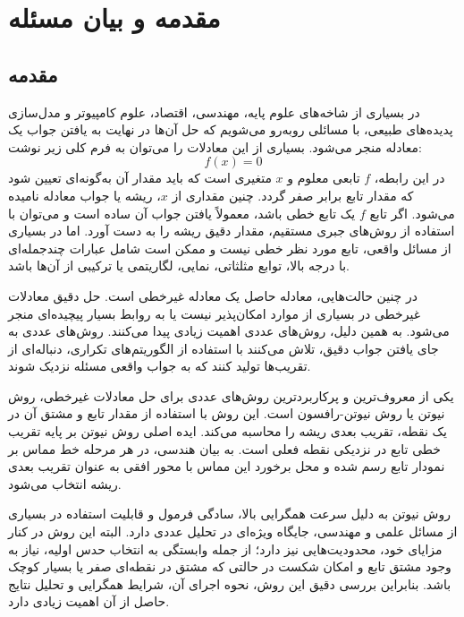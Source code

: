 \chapter{مقدمه و بیان مسئله}
\label{ch:intro}

\section{مقدمه}

در بسیاری از شاخه‌های علوم پایه، مهندسی، اقتصاد، علوم کامپیوتر و مدل‌سازی پدیده‌های طبیعی، با مسائلی روبه‌رو می‌شویم که حل آن‌ها در نهایت به یافتن جواب یک معادله منجر می‌شود. بسیاری از این معادلات را می‌توان به فرم کلی زیر نوشت:
\begin{equation}
f(x)=0
\label{eq:fzero}
\end{equation}
در این رابطه، $f$ تابعی معلوم و $x$ متغیری است که باید مقدار آن به‌گونه‌ای تعیین شود که مقدار تابع برابر صفر گردد. چنین مقداری از $x$، ریشه یا جواب معادله نامیده می‌شود. اگر تابع $f$ یک تابع خطی باشد، معمولاً یافتن جواب آن ساده است و می‌توان با استفاده از روش‌های جبری مستقیم، مقدار دقیق ریشه را به دست آورد. اما در بسیاری از مسائل واقعی، تابع مورد نظر خطی نیست و ممکن است شامل عبارات چندجمله‌ای با درجه بالا، توابع مثلثاتی، نمایی، لگاریتمی یا ترکیبی از آن‌ها باشد.

در چنین حالت‌هایی، معادله حاصل یک معادله غیرخطی است. حل دقیق معادلات غیرخطی در بسیاری از موارد امکان‌پذیر نیست یا به روابط بسیار پیچیده‌ای منجر می‌شود. به همین دلیل، روش‌های عددی اهمیت زیادی پیدا می‌کنند. روش‌های عددی به جای یافتن جواب دقیق، تلاش می‌کنند با استفاده از الگوریتم‌های تکراری، دنباله‌ای از تقریب‌ها تولید کنند که به جواب واقعی مسئله نزدیک شوند.

یکی از معروف‌ترین و پرکاربردترین روش‌های عددی برای حل معادلات غیرخطی، روش نیوتن یا روش نیوتن-رافسون است. این روش با استفاده از مقدار تابع و مشتق آن در یک نقطه، تقریب بعدی ریشه را محاسبه می‌کند. ایده اصلی روش نیوتن بر پایه تقریب خطی تابع در نزدیکی نقطه فعلی است. به بیان هندسی، در هر مرحله خط مماس بر نمودار تابع رسم شده و محل برخورد این مماس با محور افقی به عنوان تقریب بعدی ریشه انتخاب می‌شود.

روش نیوتن به دلیل سرعت همگرایی بالا، سادگی فرمول و قابلیت استفاده در بسیاری از مسائل علمی و مهندسی، جایگاه ویژه‌ای در تحلیل عددی دارد. البته این روش در کنار مزایای خود، محدودیت‌هایی نیز دارد؛ از جمله وابستگی به انتخاب حدس اولیه، نیاز به وجود مشتق تابع و امکان شکست در حالتی که مشتق در نقطه‌ای صفر یا بسیار کوچک باشد. بنابراین بررسی دقیق این روش، نحوه اجرای آن، شرایط همگرایی و تحلیل نتایج حاصل از آن اهمیت زیادی دارد.


